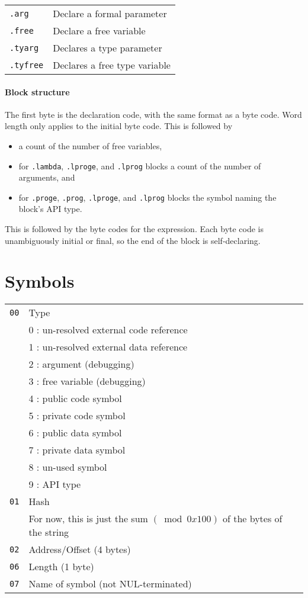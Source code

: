 \documentclass{article}
\begin{document}
\begin{tabular}{l@{ --- }l}
  \texttt{.arg} & Declare a formal parameter \\
  \texttt{.free} & Declare a free variable \\
  \texttt{.tyarg} & Declares a type parameter \\
  \texttt{.tyfree} & Declares a free type variable \\
\end{tabular}

\paragraph{Block structure}

The first byte is the declaration code, with the same format as a byte code.
Word length only applies to the initial byte code.
This is followed by
\begin{itemize}
\item a count of the number of free variables,
\item for \texttt{.lambda}, \texttt{.lproge}, and \texttt{.lprog} blocks a count of the number of arguments, and
\item for \texttt{.proge}, \texttt{.prog}, \texttt{.lproge}, and \texttt{.lprog} blocks the symbol naming the block's API type.
\end{itemize}
This is followed by the byte codes for the expression.
Each byte code is unambiguously initial or final, so the end of the block is self-declaring.

\section{Symbols}

\begin{tabular}{rl}
  \texttt{00} & Type \\
  & 0 : un-resolved external code reference \\
  & 1 : un-resolved external data reference \\
  & 2 : argument (debugging) \\
  & 3 : free variable (debugging) \\
  & 4 : public code symbol \\
  & 5 : private code symbol \\
  & 6 : public data symbol \\
  & 7 : private data symbol \\
  & 8 : un-used symbol \\
  & 9 : API type \\
  \texttt{01} & Hash \\
  & For now, this is just the sum $(\bmod 0x100)$ of the bytes of the string \\
  \texttt{02} & Address/Offset (4 bytes) \\
  \texttt{06} & Length (1 byte) \\
  \texttt{07} & Name of symbol (not NUL-terminated) \\
\end{tabular}

\end{document}
